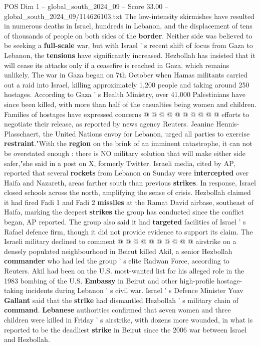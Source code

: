 \begin{textsample}{POS Dim 1 – global\_south\_2024\_09 – Score 33.00 – global\_south\_2024\_09/114626103.txt}
The low-intensity skirmishes have resulted in numerous deaths in Israel, hundreds in Lebanon, and the displacement of tens of thousands of people on both sides of the \textbf{border}.
Neither side was believed to be seeking a \textbf{full-scale} war, but with Israel ' s recent shift of focus from Gaza to Lebanon, the \textbf{tensions} have significantly increased.
Hezbollah has insisted that it will cease its attacks only if a ceasefire is reached in Gaza, which remains unlikely.
The war in Gaza began on 7th October when Hamas militants carried out a raid into Israel, killing approximately 1,200 people and taking around 250 hostages.
According to Gaza ' s Health Ministry, over 41,000 Palestinians have since been killed, with more than half of the casualties being women and children.
Families of hostages have expressed concerns @ @ @ @ @ @ @ @ @ @ efforts to negotiate their release, as reported by news agency Reuters.
Jeanine Hennis-Plasschaert, the United Nations envoy for Lebanon, urged all parties to exercise \textbf{restraint}."With the \textbf{region} on the brink of an imminent catastrophe, it can not be overstated enough : there is NO military solution that will make either side safer,"she said in a post on X, formerly Twitter.
Israeli media, cited by AP, reported that several \textbf{rockets} from Lebanon on Sunday were \textbf{intercepted} over Haifa and Nazareth, areas farther south than previous \textbf{strikes}.
In response, Israel closed schools across the north, amplifying the sense of crisis.
Hezbollah claimed it had fired Fadi 1 and Fadi 2 \textbf{missiles} at the Ramat David airbase, southeast of Haifa, marking the deepest \textbf{strikes} the group has conducted since the conflict began, AP reported.
The group also said it had \textbf{targeted} facilities of Israel ' s Rafael defence firm, though it did not provide evidence to support its claim.
The Israeli military declined to comment @ @ @ @ @ @ @ @ @ @ airstrike on a densely populated neighbourhood in Beirut killed Akil, a senior Hezbollah \textbf{commander} who had led the group ' s elite Radwan Force, according to Reuters.
Akil had been on the U.S. most-wanted list for his alleged role in the 1983 bombing of the U.S. \textbf{Embassy} in Beirut and other high-profile hostage-taking incidents during Lebanon ' s civil war.
Israel ' s Defence Minister Yoav \textbf{Gallant} said that the \textbf{strike} had dismantled Hezbollah ' s military chain of \textbf{command}. \textbf{Lebanese} authorities confirmed that seven women and three children were killed in Friday ' s airstrike, with dozens more wounded, in what is reported to be the deadliest \textbf{strike} in Beirut since the 2006 war between Israel and Hezbollah.

\end{textsample}
